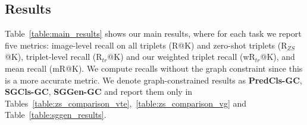 \subsection{Results}
Table~\ref{table:main_results} shows our main results, where for each task we report five metrics: image-level recall on all triplets (R@K) and zero-shot triplets (R$_{ZS}$@K), triplet-level recall (R$_{tr}$@K) and our weighted triplet recall (wR$_{tr}$@K), and mean recall (mR@K). We compute recalls without the graph constraint since
this is a more accurate metric. We denote graph-constrained results as \textbf{PredCls-GC}, \textbf{SGCls-GC}, \textbf{SGGen-GC} and report them only in Tables~\ref{table:zs_comparison_vte},~\ref{table:zs_comparison_vg} and Table~\ref{table:sggen_results}.



